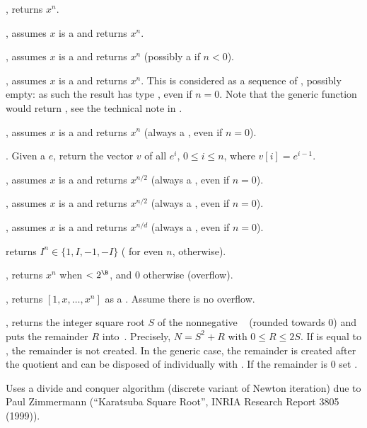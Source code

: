 , returns $x^n$.

, assumes $x$ is a  and returns $x^n$.

, assumes $x$ is a  and returns $x^n$
(possibly a  if $n < 0$).

, assumes $x$ is a  and returns
$x^n$. This is considered as a sequence of , possibly empty:
as such the result has type , even if $n = 0$.
Note that the generic function  would return ,
see the technical note in .

, assumes $x$ is a  and returns $x^n$
(always a , even if $n = 0$).

. Given a  $e$, return the vector
$v$ of all $e^i$, $0 \leq i \leq n$, where $v[i] = e^{i-1}$.

, assumes $x$ is a  and returns
$x^{n/2}$ (always a , even if $n = 0$).

, assumes $x$ is a  and returns
$x^{n/2}$ (always a , even if $n = 0$).

, assumes $x$ is a  and
returns $x^{n/d}$ (always a , even if $n = 0$).

 returns $I^n\in\{1,I,-1,-I\}$ ( for even $n$,
 otherwise).

, returns $x^n$ when $< 2^\B$, and $0$
otherwise (overflow).

, returns $[1,x,\ldots,x^n]$ as a
. Assume there is no overflow.

, returns the integer square root $S$ of
the nonnegative ~ (rounded towards 0) and puts the remainder
$R$ into~. Precisely, $N = S^2 + R$ with $0\leq R \leq 2S$. If
 is equal to , the remainder is not created. In the generic
case, the remainder is created after the quotient and can be disposed of
individually with . If the remainder is $0$ set .

Uses a divide and conquer algorithm (discrete variant of Newton iteration)
due to Paul Zimmermann (``Karatsuba Square Root'', INRIA Research Report 3805
(1999)).

